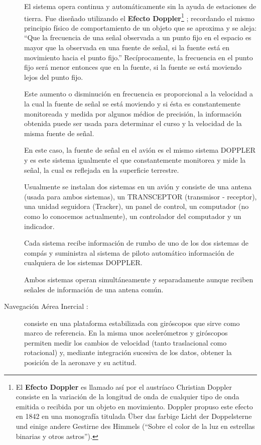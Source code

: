 \documentclass[a4paper,12pt,twoside]{article}
\begin{document}
\begin{description}
El sistema opera continua y autom\'aticamente sin la ayuda de estaciones de tierra. Fue dise\~nado utilizando el \textbf{Efecto Doppler}\footnote{ El \textbf{Efecto Doppler} es llamado as\'i por el austr\'iaco Christian Doppler consiste en la variaci\'on de la longitud de onda de cualquier tipo de onda emitida o recibida por un objeto en movimiento. Doppler propuso este efecto en 1842 en una monograf\'ia titulada Über das farbige Licht der Doppelsterne und einige andere Gestirne des Himmels (``Sobre el color de la luz en estrellas binarias y otros astros''). } ; recordando el mismo principio f\'isico de comportamiento de un objeto que se aproxima y se aleja: ``Que la frecuencia de una se\~nal observada a un punto fijo en el espacio es mayor que la observada en una fuente de se\~nal, si la fuente est\'a en movimiento hacia el punto fijo.''     Rec\'iprocamente, la frecuencia en el punto fijo ser\'a menor entonces que en la fuente, si la fuente se est\'a moviendo lejos del punto fijo.

Este aumento o disminuci\'on en frecuencia es proporcional a la velocidad a la cual la fuente de se\~nal se est\'a moviendo y si \'esta es constantemente monitoreada y medida por algunos m\'edios de precisi\'on, la informaci\'on obtenida puede ser usada para determinar el curso y la velocidad de la misma fuente de se\~nal.

En este caso, la fuente de se\~nal en el avi\'on es el mismo sistema DOPPLER y es este sistema igualmente el que constantemente monitorea y mide la se\~nal, la cual es reflejada en la superficie terrestre.

Usualmente se instalan dos sistemas en un avi\'on y consiste de una antena (usada para ambos sistemas), un TRANSCEPTOR (transmisor - receptor), una unidad seguidora (Tracker), un panel de control, un computador (no como lo conocemos actualmente), un controlador del computador y un indicador.

Cada sistema recibe informaci\'on de rumbo de uno de los dos sistemas de comp\'as y suministra al sistema de piloto autom\'atico informaci\'on de cualquiera de los sistemas DOPPLER.

Ambos sistemas operan simult\'aneamente y separadamente aunque reciben se\~nales de informaci\'on de una antena com\'un.



\item[Navegaci\'on A\'erea Inercial \cite{Salazar_nav_aerea}:] consiste en una plataforma estabilizada con gir\'oscopos que sirve como marco de referencia. En la misma unos aceler\'ometros y gir\'oscopos permiten medir los cambios de velocidad (tanto traslacional como rotacional) y, mediante integraci\'on sucesiva de los datos, obtener la posici\'on de la aeronave y su \gls{actitud}.



\end{description}
\end{document}
